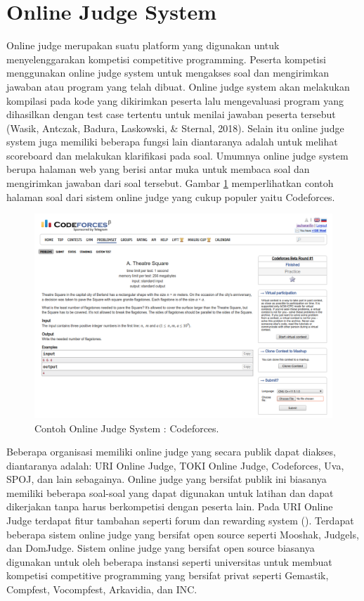 \section{Online Judge System}

\par Online judge merupakan suatu platform yang digunakan untuk menyelenggarakan kompetisi competitive programming. Peserta kompetisi menggunakan online judge system untuk mengakses soal dan mengirimkan jawaban atau program yang telah dibuat. Online judge system akan melakukan kompilasi pada kode yang dikirimkan peserta lalu mengevaluasi program yang dihasilkan dengan test case tertentu untuk menilai jawaban peserta tersebut (Wasik, Antczak, Badura, Laskowski, \& Sternal, 2018). Selain itu online judge system juga memiliki beberapa fungsi lain diantaranya adalah untuk melihat scoreboard dan melakukan klarifikasi pada soal. Umumnya online judge system berupa halaman web yang berisi antar muka untuk membaca soal dan mengirimkan jawaban dari soal tersebut. Gambar \ref{fig:codeforces} memperlihatkan contoh halaman soal dari sistem online judge yang cukup populer yaitu Codeforces.

\begin{figure}
	\centering
	\includegraphics[width=\textwidth]{images/codeforces}
	\caption{Contoh Online Judge System : Codeforces.}
	\label{fig:codeforces}
\end{figure}

\par Beberapa organisasi memiliki online judge yang secara publik dapat diakses, diantaranya adalah: URI Online Judge, TOKI Online Judge, Codeforces, Uva, SPOJ, dan lain sebagainya. Online judge yang bersifat publik ini biasanya memiliki beberapa soal-soal yang dapat digunakan untuk latihan dan dapat dikerjakan tanpa harus berkompetisi dengan peserta lain. Pada URI Online Judge terdapat fitur tambahan seperti forum dan rewarding system (\cite{uriojpaper}). Terdapat beberapa sistem online judge yang bersifat open source seperti Mooshak, Judgels, dan DomJudge. Sistem online judge yang bersifat open source biasanya digunakan untuk oleh beberapa instansi seperti universitas untuk membuat kompetisi competitive programming yang bersifat privat seperti Gemastik, Compfest, Vocompfest, Arkavidia, dan INC.

